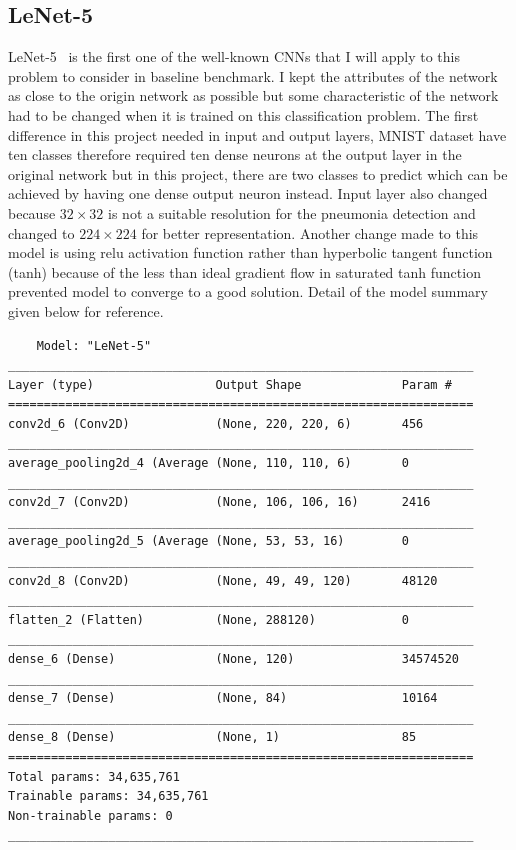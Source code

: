 \subsection{LeNet-5}
LeNet-5~\cite{Lenet5} is the first one of the well-known CNNs that I will apply to this problem to consider in baseline benchmark.
I kept the attributes of the network as close to the origin network as possible but some characteristic of the network had to be changed when it is trained on this classification problem.
The first difference in this project needed in input and output layers, MNIST dataset have ten classes therefore required ten dense neurons at the output layer in the original network but in this project, there are two classes to predict which can be achieved by having one dense output neuron instead.
Input layer also changed because $32 \times 32$ is not a suitable resolution for the pneumonia detection and changed to $224 \times 224$ for better representation.
Another change made to this model is using relu activation function rather than hyperbolic tangent function (tanh) because of the less than ideal gradient flow in saturated tanh function prevented model to converge to a good solution.
Detail of the model summary given below for reference.

\begin{verbatim}
    Model: "LeNet-5"
_________________________________________________________________
Layer (type)                 Output Shape              Param #   
=================================================================
conv2d_6 (Conv2D)            (None, 220, 220, 6)       456       
_________________________________________________________________
average_pooling2d_4 (Average (None, 110, 110, 6)       0         
_________________________________________________________________
conv2d_7 (Conv2D)            (None, 106, 106, 16)      2416      
_________________________________________________________________
average_pooling2d_5 (Average (None, 53, 53, 16)        0         
_________________________________________________________________
conv2d_8 (Conv2D)            (None, 49, 49, 120)       48120     
_________________________________________________________________
flatten_2 (Flatten)          (None, 288120)            0         
_________________________________________________________________
dense_6 (Dense)              (None, 120)               34574520  
_________________________________________________________________
dense_7 (Dense)              (None, 84)                10164     
_________________________________________________________________
dense_8 (Dense)              (None, 1)                 85        
=================================================================
Total params: 34,635,761
Trainable params: 34,635,761
Non-trainable params: 0
_________________________________________________________________
\end{verbatim}

